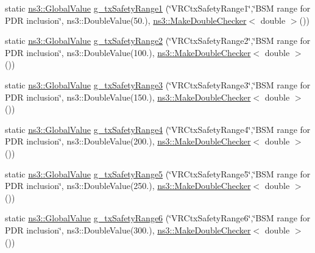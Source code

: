 \begin{DoxyCompactItemize}
\item 
static \hyperlink{classns3_1_1GlobalValue}{ns3\+::\+Global\+Value} \hyperlink{vanet-routing-compare_8cc_a25cdd03b03a3a5add504c89cc7204db8}{g\+\_\+tx\+Safety\+Range1} (\char`\"{}V\+R\+Ctx\+Safety\+Range1\char`\"{},\char`\"{}B\+SM range for P\+DR inclusion\char`\"{}, ns3\+::\+Double\+Value(50.), \hyperlink{namespacens3_a0f8000e7b66dd988358648f0b16c7709}{ns3\+::\+Make\+Double\+Checker}$<$ double $>$())
\item 
static \hyperlink{classns3_1_1GlobalValue}{ns3\+::\+Global\+Value} \hyperlink{vanet-routing-compare_8cc_a2aa368ab5b1472c39d9fd72091056f94}{g\+\_\+tx\+Safety\+Range2} (\char`\"{}V\+R\+Ctx\+Safety\+Range2\char`\"{},\char`\"{}B\+SM range for P\+DR inclusion\char`\"{}, ns3\+::\+Double\+Value(100.), \hyperlink{namespacens3_a0f8000e7b66dd988358648f0b16c7709}{ns3\+::\+Make\+Double\+Checker}$<$ double $>$())
\item 
static \hyperlink{classns3_1_1GlobalValue}{ns3\+::\+Global\+Value} \hyperlink{vanet-routing-compare_8cc_a5f3119c94f9177355890bc0bf8edfd76}{g\+\_\+tx\+Safety\+Range3} (\char`\"{}V\+R\+Ctx\+Safety\+Range3\char`\"{},\char`\"{}B\+SM range for P\+DR inclusion\char`\"{}, ns3\+::\+Double\+Value(150.), \hyperlink{namespacens3_a0f8000e7b66dd988358648f0b16c7709}{ns3\+::\+Make\+Double\+Checker}$<$ double $>$())
\item 
static \hyperlink{classns3_1_1GlobalValue}{ns3\+::\+Global\+Value} \hyperlink{vanet-routing-compare_8cc_a95eb3404e21982cf67b8704827334dac}{g\+\_\+tx\+Safety\+Range4} (\char`\"{}V\+R\+Ctx\+Safety\+Range4\char`\"{},\char`\"{}B\+SM range for P\+DR inclusion\char`\"{}, ns3\+::\+Double\+Value(200.), \hyperlink{namespacens3_a0f8000e7b66dd988358648f0b16c7709}{ns3\+::\+Make\+Double\+Checker}$<$ double $>$())
\item 
static \hyperlink{classns3_1_1GlobalValue}{ns3\+::\+Global\+Value} \hyperlink{vanet-routing-compare_8cc_a1f274907a45e3e9daee777fa69e0fefa}{g\+\_\+tx\+Safety\+Range5} (\char`\"{}V\+R\+Ctx\+Safety\+Range5\char`\"{},\char`\"{}B\+SM range for P\+DR inclusion\char`\"{}, ns3\+::\+Double\+Value(250.), \hyperlink{namespacens3_a0f8000e7b66dd988358648f0b16c7709}{ns3\+::\+Make\+Double\+Checker}$<$ double $>$())
\item 
static \hyperlink{classns3_1_1GlobalValue}{ns3\+::\+Global\+Value} \hyperlink{vanet-routing-compare_8cc_a737d92105ce1c40374baf96145cb029c}{g\+\_\+tx\+Safety\+Range6} (\char`\"{}V\+R\+Ctx\+Safety\+Range6\char`\"{},\char`\"{}B\+SM range for P\+DR inclusion\char`\"{}, ns3\+::\+Double\+Value(300.), \hyperlink{namespacens3_a0f8000e7b66dd988358648f0b16c7709}{ns3\+::\+Make\+Double\+Checker}$<$ double $>$())

\end{DoxyCompactItemize}
